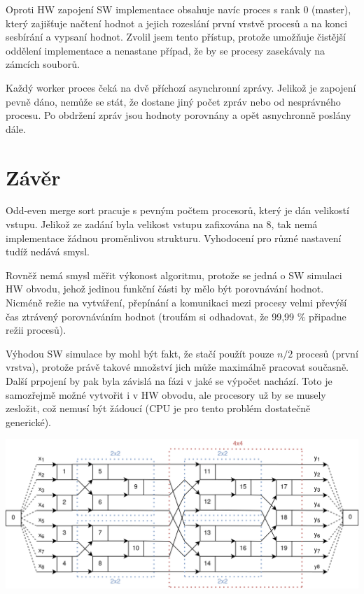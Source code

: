 \documentclass[12pt]{article}
\begin{document}
Oproti HW zapojení SW implementace obsahuje navíc proces s rank 0 (master), který zajišťuje načtení hodnot a jejich rozeslání první vrstvě procesů a na konci sesbírání a vypsaní hodnot. Zvolil jsem tento přístup, protože umožňuje čistější oddělení implementace a nenastane případ, že by se procesy zasekávaly na zámcích souborů.

Každý worker proces čeká na dvě příchozí asynchronní zprávy. Jelikož je zapojení pevně dáno, nemůže se stát, že dostane jiný počet zpráv nebo od nesprávného procesu. Po obdržení zpráv jsou hodnoty porovnány a opět asnychronně poslány dále.

\section{Závěr}
Odd-even merge sort pracuje s pevným počtem procesorů, který je dán velikostí vstupu. Jelikož ze zadání byla velikost vstupu zafixována na 8, tak nemá implementace žádnou proměnlivou strukturu. Vyhodocení pro různé nastavení tudíž nedává smysl. 

Rovněž nemá smysl měřit výkonost algoritmu, protože se jedná o SW simulaci HW obvodu, jehož jedinou funkční části by mělo být porovnávání hodnot. Nicméně režie na vytváření, přepínání a komunikaci mezi procesy velmi převýší čas ztrávený porovnáváním hodnot (troufám si odhadovat, že 99,99 \% připadne režii procesů). 

Výhodou SW simulace by mohl být fakt, že stačí použít pouze \(n/2\) procesů (první vrstva), protože právě takové množství jich může maximálně pracovat současně. Další prpojení by pak byla závislá na fázi v jaké se výpočet nachází. Toto je samozřejmě možné vytvořit i v HW obvodu, ale procesory už by se musely zesložit, což nemusí být žádoucí (CPU je pro tento problém dostatečně generické).

\hspace{-2cm}
\includegraphics[width=0.9\paperwidth]{4x4-diagram.png}
\label{diagram}
\end{document}
